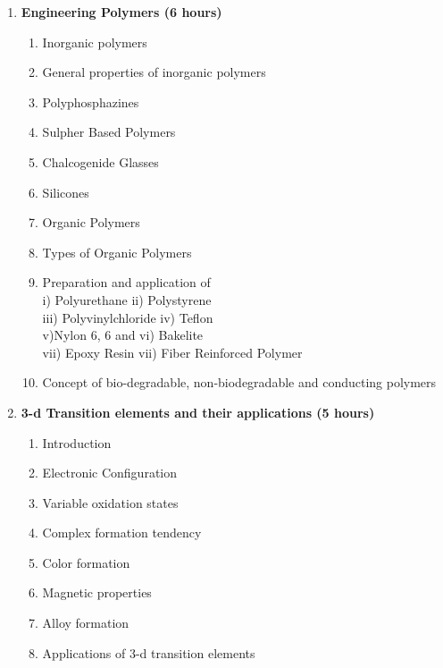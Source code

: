 \begin{enumerate}
    \item \textbf{Engineering Polymers \hfill (6 hours)}
    \begin{enumerate}
        \item Inorganic polymers
        \item General properties of inorganic polymers
        \item Polyphosphazines
        \item Sulpher Based Polymers
        \item Chalcogenide Glasses
        \item Silicones
        \item Organic Polymers
        \item Types of Organic Polymers
        \item Preparation and application of \\ i) Polyurethane ii) Polystyrene \\ iii) Polyvinylchloride iv) Teflon \\ v)Nylon 6, 6 and vi) Bakelite \\ vii) Epoxy Resin vii) Fiber Reinforced Polymer
        \item Concept of bio-degradable, non-biodegradable and conducting polymers
    \end{enumerate}
    
    \item \textbf{3-d Transition elements and their applications \hfill (5 hours)}
    \begin{enumerate}
        \item Introduction
        \item Electronic Configuration
        \item Variable oxidation states
        \item Complex formation tendency
        \item Color formation
        \item Magnetic properties
        \item Alloy formation
        \item Applications of 3-d transition elements
    \end{enumerate}
    

\end{enumerate}
